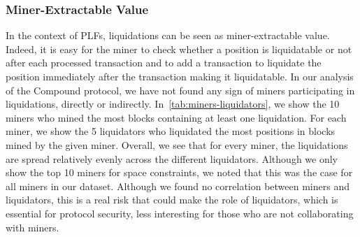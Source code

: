 
\subsubsection{Miner-Extractable Value}
In the context of PLFs, liquidations can be seen as miner-extractable value.
Indeed, it is easy for the miner to check whether a position is liquidatable or not after each processed transaction and to add a transaction to liquidate the position immediately after the transaction making it liquidatable.
In our analysis of the Compound protocol, we have not found any sign of miners participating in liquidations, directly or indirectly.
In~\autoref{tab:miners-liquidators}, we show the 10 miners who mined the most blocks containing at least one liquidation.
For each miner, we show the 5 liquidators who liquidated the most positions in blocks mined by the given miner.
Overall, we see that for every miner, the liquidations are spread relatively evenly across the different liquidators.
Although we only show the top 10 miners for space constraints, we noted that this was the case for all miners in our dataset.
Although we found no correlation between miners and liquidators, this is a real risk that could make the role of liquidators, which is essential for protocol security, less interesting for those who are not collaborating with miners.
